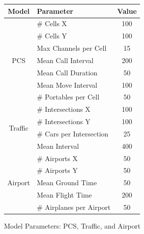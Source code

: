 \documentclass[11pt]{book}
\begin{document}
\begin{figure}
    \begin{center}
        \begin{tabular}{|| c | l | c ||}
            \hline
            Model & Parameter & Value \\ [0.5ex]
            \hline\hline
            \multirow{7}{*}{PCS}
                & \# Cells X            & 100   \\
                & \# Cells Y            & 100   \\
                & Max Channels per Cell & 15    \\
                & Mean Call Interval    & 200   \\
                & Mean Call Duration    & 50    \\
                & Mean Move Interval    & 100   \\
                & \# Portables per Cell & 50    \\ [0.5ex]
            \hline\hline
            \multirow{4}{*}{Traffic}
                & \# Intersections X        & 100   \\
                & \# Intersections Y        & 100   \\
                & \# Cars per Intersection  & 25    \\
                & Mean Interval             & 400   \\ [0.5ex]
            \hline\hline
            \multirow{5}{*}{Airport}
                & \# Airports X             & 50    \\
                & \# Airports Y             & 50    \\
                & Mean Ground Time          & 50    \\
                & Mean Flight Time          & 200   \\
                & \# Airplanes per Airport  & 50    \\
            \hline
        \end{tabular}
        \caption{Model Parameters: PCS, Traffic, and Airport}\label{model_params0}
    \end{center}
\end{figure}
\end{document}
